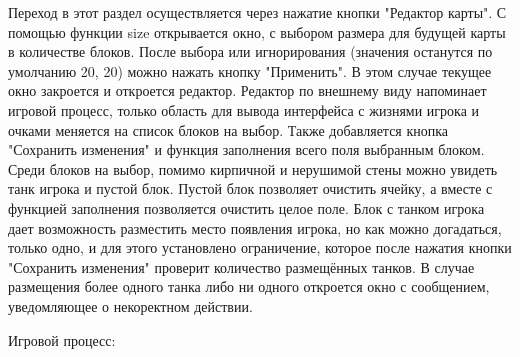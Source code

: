 Переход в этот раздел осуществляется через нажатие кнопки "Редактор карты". С помощью функции size открывается окно, с выбором размера для будущей карты в количестве блоков. После выбора или игнорирования (значения останутся по умолчанию 20, 20) можно нажать кнопку "Применить". В этом случае текущее окно закроется и откроется редактор. Редактор по внешнему виду напоминает игровой процесс, только область для вывода интерфейса с жизнями игрока и очками меняется на список блоков на выбор. Также добавляется кнопка "Сохранить изменения" и функция заполнения всего поля выбранным блоком. Среди блоков на выбор, помимо кирпичной и нерушимой стены можно увидеть танк игрока и пустой блок. Пустой блок позволяет очистить ячейку, а вместе с функцией заполнения позволяется очистить целое поле. Блок с танком игрока дает возможность разместить место появления игрока, но как можно догадаться, только одно, и для этого установлено ограничение, которое после нажатия кнопки "Сохранить изменения" проверит количество размещённых танков. В случае размещения более одного танка либо ни одного откроется окно с сообщением, уведомляющее о некоректном действии.

Игровой процесс:

